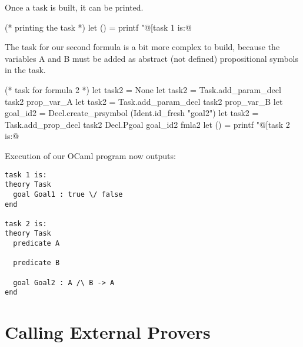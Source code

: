 Once a task is built, it can be printed.
\begin{ocamlcode}
(* printing the task *)
let () = printf "@[task 1 is:@\n%
\end{ocamlcode}

The task for our second formula is a bit more complex to build, because
the variables A and B must be added as abstract (\ie not defined)
propositional symbols in the task.
\begin{ocamlcode}
(* task for formula 2 *)
let task2 = None
let task2 = Task.add_param_decl task2 prop_var_A
let task2 = Task.add_param_decl task2 prop_var_B
let goal_id2 = Decl.create_prsymbol (Ident.id_fresh "goal2")
let task2 = Task.add_prop_decl task2 Decl.Pgoal goal_id2 fmla2
let () = printf "@[task 2 is:@\n%
\end{ocamlcode}

Execution of our OCaml program now outputs:
\begin{verbatim}
task 1 is:
theory Task
  goal Goal1 : true \/ false
end

task 2 is:
theory Task
  predicate A

  predicate B

  goal Goal2 : A /\ B -> A
end
\end{verbatim}

\section{Calling External Provers}

